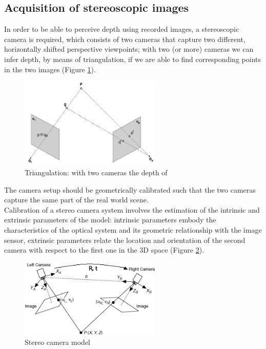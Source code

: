 \subsection{Acquisition of stereoscopic images}\label{sec:acquisition-of-stereoscopic-images}

In order to be able to perceive depth using recorded images, a stereoscopic camera is required,
which consists of two cameras that capture two different, horizontally shifted perspective
viewpoints; with two (or more) cameras we can infer depth, by means of triangulation, if we are able to find corresponding points in the two images (Figure \ref{fig:corr}).\\
\begin{figure}[h!]
\centering
\includegraphics[width=0.6\textwidth]{./img/correspondance.png}
\caption{\small{Triangulation: with two cameras the depth of }}
\label{fig:corr}
\end{figure}
 The camera setup should be geometrically
calibrated such that the two cameras capture the same part of the real world scene.\\
Calibration of a stereo camera system involves the estimation of the intrinsic and extrinsic parameters of the model: intrinsic parameters embody the characteristics of the optical system and its geometric relationship with the image sensor, extrinsic parameters relate the location and orientation of the second camera with respect to the first one in the 3D space (Figure \ref{fig:rt}).\\
\begin{figure}[h!]
\centering
\includegraphics[width=0.6\textwidth]{./img/stereo_system.png}
\caption{\small{Stereo camera model}}
\label{fig:rt}
\end{figure}
